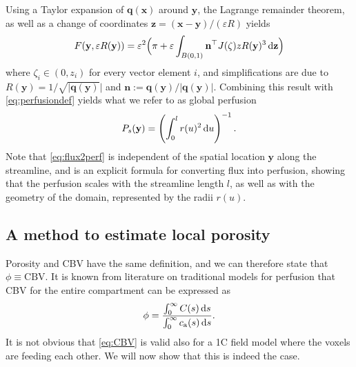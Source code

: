 \documentclass[final,5p,times,twocolumn]{elsarticle}
\begin{document}
	Using a Taylor expansion of $\mathbf{q}(\mathbf{x})$ around $\mathbf{y}$, the Lagrange remainder theorem, as well as a change of coordinates $\mathbf{z} = (\mathbf{x}-\mathbf{y})/(\varepsilon R)$ yields 
	\begin{equation}
		F(\mathbf{y},\varepsilon R(\mathbf{y}))
		= \varepsilon^2 \Big(\pi + \varepsilon \int_{B(0,1)} \mathbf{n}^\top J(\zeta)zR(\mathbf{y})^3 \,\mathrm{d} \mathbf{z} \Big)
	\end{equation}
	where $\zeta_i \in (0,z_i)$ for every vector element $i$, and simplifications are due to $R(\mathbf{y}) = 1/\sqrt{\vert \mathbf{q}(\mathbf{y})} \vert$ and $\mathbf{n}:=\mathbf{q}(\mathbf{y})/\vert \mathbf{q}(\mathbf{y}) \vert$.
	Combining this result with \eqref{eq:perfusiondef} yields what we refer to as global perfusion
	\begin{equation}\label{eq:flux2perf}
		P_s(\mathbf{y}) = \left(\int_0^l r(u)^2 \,\mathrm{d} u\right)^{-1}.
	\end{equation}
	Note that \eqref{eq:flux2perf} is independent of the spatial location $\mathbf{y}$ along the streamline, and is an explicit formula for converting flux into perfusion, showing that the perfusion scales with the streamline length $l$, as well as with the geometry of the domain, represented by the radii $r(u)$.


	\subsection{A method to estimate local porosity}\label{sec:CBV}

	Porosity and CBV have the same definition, and we can therefore state that $\phi \equiv \mathrm{CBV}$. It is known from literature on traditional models \cite{sourbron13} for perfusion that CBV for the entire compartment can be expressed as
	\begin{equation}
		\phi = \frac{\int_0^\infty C(s) \,\mathrm{d} s}{\int_0^\infty c_\mathrm{a}(s) \,\mathrm{d} s}.
		\label{eq:CBV}
	\end{equation}
	It is not obvious that \eqref{eq:CBV} is valid also for a 1C field model where the voxels are feeding each other. 
	We will now show that this is indeed the case.
	
\end{document}
